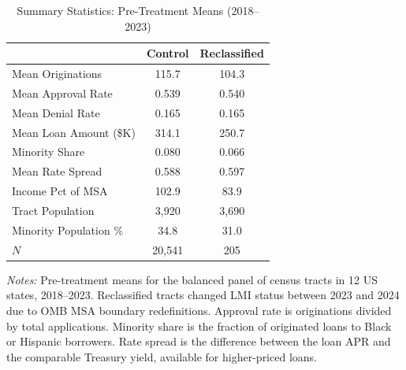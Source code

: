 \begin{table}[htbp]
\centering
\caption{Summary Statistics: Pre-Treatment Means (2018--2023)}
\label{tab:sumstats}
\begin{threeparttable}
\begin{tabular}{lcc}
\toprule
 & Control & Reclassified \\
\midrule
Mean Originations & 115.7 & 104.3 \\
Mean Approval Rate & 0.539 & 0.540 \\
Mean Denial Rate & 0.165 & 0.165 \\
Mean Loan Amount (\$K) & 314.1 & 250.7 \\
Minority Share & 0.080 & 0.066 \\
Mean Rate Spread & 0.588 & 0.597 \\
Income Pct of MSA & 102.9 & 83.9 \\
Tract Population & 3,920 & 3,690 \\
Minority Population \% & 34.8 & 31.0 \\
$N$ & 20,541 & 205 \\
\bottomrule
\end{tabular}
\begin{tablenotes}[flushleft]
\small
\item \textit{Notes:} Pre-treatment means for the balanced panel of census tracts in 12 US states, 2018--2023. Reclassified tracts changed LMI status between 2023 and 2024 due to OMB MSA boundary redefinitions. Approval rate is originations divided by total applications. Minority share is the fraction of originated loans to Black or Hispanic borrowers. Rate spread is the difference between the loan APR and the comparable Treasury yield, available for higher-priced loans.
\end{tablenotes}
\end{threeparttable}
\end{table}
